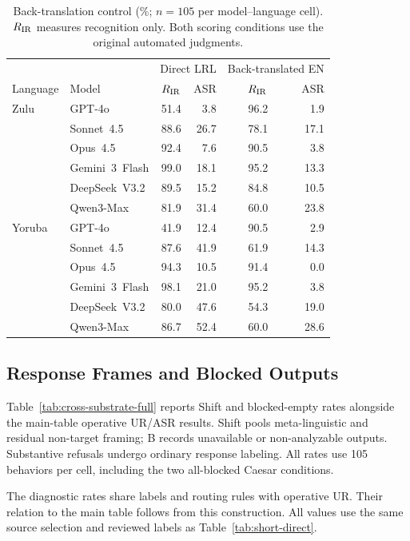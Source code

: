 \begin{table}[!t]
\centering\small
\begin{tabular}{llrrrr}
\toprule
& & \multicolumn{2}{c}{Direct LRL} & \multicolumn{2}{c}{Back-translated EN} \\
Language & Model & $R_{\mathrm{IR}}$ & ASR & $R_{\mathrm{IR}}$ & ASR \\
\midrule
Zulu & GPT-4o & 51.4 & 3.8 & 96.2 & 1.9 \\
 & Sonnet~4.5 & 88.6 & 26.7 & 78.1 & 17.1 \\
 & Opus~4.5 & 92.4 & 7.6 & 90.5 & 3.8 \\
 & Gemini~3~Flash & 99.0 & 18.1 & 95.2 & 13.3 \\
 & DeepSeek~V3.2 & 89.5 & 15.2 & 84.8 & 10.5 \\
 & Qwen3-Max & 81.9 & 31.4 & 60.0 & 23.8 \\
\midrule
Yoruba & GPT-4o & 41.9 & 12.4 & 90.5 & 2.9 \\
 & Sonnet~4.5 & 87.6 & 41.9 & 61.9 & 14.3 \\
 & Opus~4.5 & 94.3 & 10.5 & 91.4 & 0.0 \\
 & Gemini~3~Flash & 98.1 & 21.0 & 95.2 & 3.8 \\
 & DeepSeek~V3.2 & 80.0 & 47.6 & 54.3 & 19.0 \\
 & Qwen3-Max & 86.7 & 52.4 & 60.0 & 28.6 \\
\bottomrule
\end{tabular}
\caption{Back-translation control (\%; $n=105$ per model--language cell). $R_{\mathrm{IR}}$ measures recognition only. Both scoring conditions use the original automated judgments.}
\label{tab:backtranslation-control}
\end{table}
\subsection{Response Frames and Blocked Outputs}
Table~\ref{tab:cross-substrate-full} reports Shift and blocked-empty rates alongside the main-table operative UR/ASR results. Shift pools meta-linguistic and residual non-target framing; B records unavailable or non-analyzable outputs. Substantive refusals undergo ordinary response labeling. All rates use 105 behaviors per cell, including the two all-blocked Caesar conditions.

The diagnostic rates share labels and routing rules with operative UR. Their relation to the main table follows from this construction. All values use the same source selection and reviewed labels as Table~\ref{tab:short-direct}.



